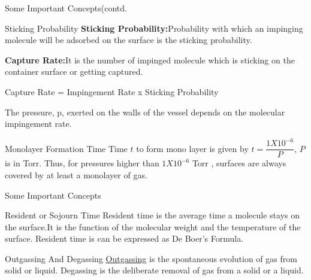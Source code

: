 \documentclass[11]{beamer}
\begin{document}
\begin{frame}{Some Important Concepts(contd.}
\begin{exampleblock}{Sticking Probability}
\textbf{Sticking Probability:}Probability with which an impinging molecule will be adsorbed on the surface is the sticking probability.

\textbf{Capture Rate:}It is the number of impinged molecule which is sticking on the container surface or getting captured.\break

\alert{Capture Rate = Impingement Rate x Sticking Probability} 

The pressure, p, exerted on the walls of the vessel depends on  the molecular impingement rate. 
\end{exampleblock}

\begin{exampleblock}{Monolayer Formation Time}
Time $t$ to form mono layer is given by $t=\dfrac{1X10^{-6}}{P}$,  $P$ is in Torr. \break
Thus, for pressures higher than $ 1X10^{-6} $ Torr , surfaces are always covered by at least a monolayer of gas.
\end{exampleblock}


\end{frame}



\begin{frame}{Some Important Concepts}


\begin{exampleblock}{Resident or Sojourn Time}
Resident time is the average time a molecule stays on the surface.It is the function of the molecular weight and the temperature of the surface.
Resident time is can be expressed as De Boer's Formula.

\end{exampleblock}




\begin{exampleblock}{Outgassing And Degassing}
\underline{Outgassing} is the spontaneous evolution of gas from solid or liquid.
Degassing is the deliberate removal of gas from a solid or a liquid.
\end{exampleblock}




\end{frame}
\end{document}

